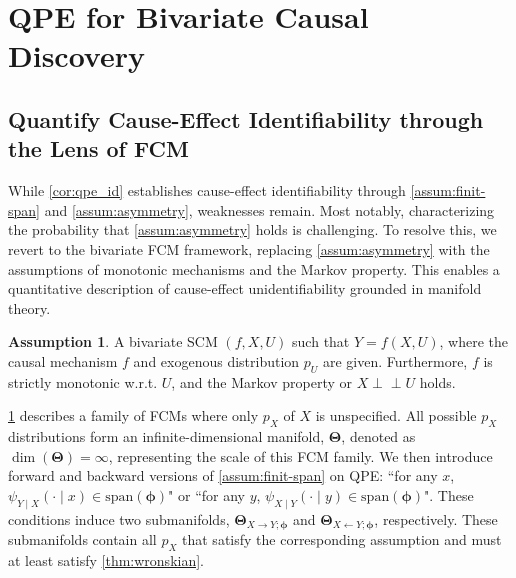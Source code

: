\documentclass{article}
\theoremstyle{plain}
\theoremstyle{definition}
\newtheorem{assumption}[theorem]{Assumption}
\theoremstyle{remark}
\newcommand{\indep}{\perp\!\!\!\perp}
\begin{document}
\section{QPE for Bivariate Causal Discovery}
\label{sec:qpe_bi_cd}
\subsection{Quantify Cause-Effect Identifiability through the Lens of FCM}
\label{ssec:bivariate-id}

While \cref{cor:qpe_id} establishes cause-effect identifiability through \cref{assum:finit-span} and \cref{assum:asymmetry}, weaknesses remain. Most notably, characterizing the probability that \cref{assum:asymmetry} holds is challenging. To resolve this, we revert to the bivariate FCM framework, replacing \cref{assum:asymmetry} with the assumptions of monotonic mechanisms and the Markov property. This enables a quantitative description of cause-effect unidentifiability grounded in manifold theory.

\begin{assumption}
\label{assum:fcm}
A bivariate SCM $(f,X,U)$ such that $Y=f(X,U)$, where the causal mechanism $f$ and exogenous distribution $p_U$ are given. Furthermore, $f$ is strictly monotonic w.r.t. $U$, and the Markov property or $X\indep U$ holds.
\end{assumption}

\cref{assum:fcm} describes a family of FCMs where only $p_X$ of $X$ is unspecified. All possible $p_X$ distributions form an infinite-dimensional manifold, $\mathbf{\Theta}$, denoted as $\dim(\mathbf{\Theta})=\infty$, representing the scale of this FCM family. We then introduce forward and backward versions of \cref{assum:finit-span} on QPE: ``for any $x$, $\psi_{Y\mid X}(\cdot\!\mid\!x)\in\text{span}(\bm{\phi})$" or ``for any $y$, $\psi_{X\mid Y}(\cdot\!\mid\!y)\in\text{span}(\bm{\phi})$". These conditions induce two submanifolds, $\mathbf{\Theta}_{X\to Y;\bm{\phi}}$ and $\mathbf{\Theta}_{X\gets Y;\bm{\phi}}$, respectively. These submanifolds contain all $p_X$ that satisfy the corresponding assumption and must at least satisfy \cref{thm:wronskian}.
\end{document}
